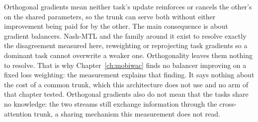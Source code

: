 Orthogonal gradients mean neither task's update reinforces or cancels the other's on the shared
parameters, so the trunk can serve both without either improvement being paid for by the other. The
main consequence is about gradient balancers. Nash-MTL and the family around it exist to resolve exactly
the disagreement measured here, reweighting or reprojecting task gradients so a dominant task cannot
overwrite a weaker one. Orthogonality leaves them nothing to resolve. That is why Chapter~\ref{ch:mobiwac} finds no
balancer improving on a fixed loss weighting: the measurement explains that finding. It says nothing
about the cost of a common trunk, which this architecture does not use and no arm of that chapter
tested. Orthogonal gradients also do not mean that the tasks share no knowledge: the two streams
still exchange information through the cross-attention trunk, a sharing mechanism this measurement
does not read.
